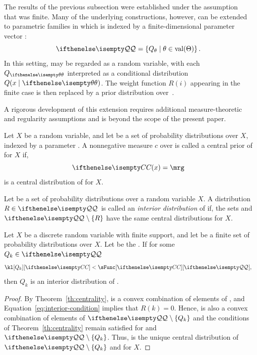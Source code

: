 \newcommand{\Qminus}[1][R]{\setQ \setminus{\{#1\}}}

The results of the previous subsection were established under the assumption that \setQ was finite.
Many of the underlying constructions, however, can be extended to parametric families
in which \setQ is indexed by a finite-dimensional parameter vector \param:
\[
    \setQ = \left\{ Q_{\theta} \mid \theta \in \operatorname{val}(\param) \right\}.
\]
In this setting, \param may be regarded as a random variable, with each $Q_{\paramVal}$ interpreted as a conditional
distribution~$Q(\xIt)$.
The weight function $R(i)$ appearing in the finite case is then replaced by a prior distribution over~\param.

A rigorous development of this extension requires additional measure-theoretic and regularity assumptions and is
beyond the scope of the present paper.

\begin{definition} \label{def:central-prior}
    Let $X$ be a random variable, and let \setQ be a set of probability distributions over $X$,
    indexed by a parameter \param.
    A nonnegative measure $c$ over \param is called a central prior of \setQ for $X$ if,
    \[
        \cDist(x) = \mrg
    \]
    is a central distribution of \setQ for $X$.
\end{definition}

\begin{definition} \label{def:interior}
    Let \setQ be a set of probability distributions over a random variable $X$.
    A distribution $R \in \setQ$ is called an \emph{interior distribution} of \setQ if,
    the sets \setQ and $\Qminus$ have the same central distributions for $X$.
\end{definition}

\begin{proposition}
    Let $X$ be a discrete random variable with finite support, and let \setQ be a finite set of probability
    distributions over $X$.
    Let \cDist be the \cd.
    If for some $Q_k \in \setQ$
    \begin{equation} \label{eq:interior-condition}
        \kl[Q_k][\cDist] < \sFunc[\cDist][\setQ],
    \end{equation}
    then $Q_k$ is an interior distribution of \setQ.
\end{proposition}

\begin{proof}
    By Theorem~\ref{th:centrality}, \cDist is a convex combination of elements of \setQ,
    and Equation~\ref{eq:interior-condition} implies that $R(k) = 0$.
    Hence, \cDist is also a convex combination of elements of $\Qminus[Q_k]$ and
    the conditions of Theorem~\ref{th:centrality} remain satisfied for \cDist and $\Qminus[Q_k]$.
    Thus, \cDist is the unique central distribution of $\Qminus[Q_k]$ and \setQ for $X$.
\end{proof}

